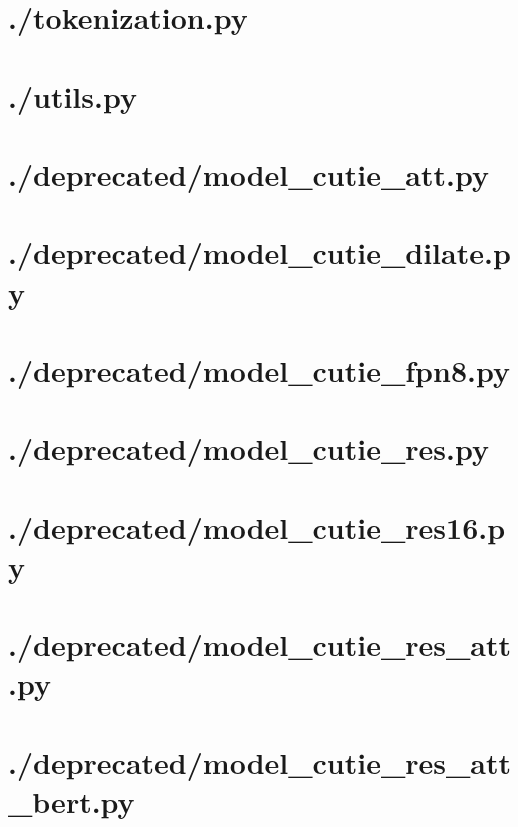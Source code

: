 \documentclass{article}
\begin{document}
    \section{./tokenization.py}
    
    \section{./utils.py}
    
    \section{./deprecated/model\_cutie\_att.py}
    
    \section{./deprecated/model\_cutie\_dilate.py}
    
    \section{./deprecated/model\_cutie\_fpn8.py}
    
    \section{./deprecated/model\_cutie\_res.py}
    
    \section{./deprecated/model\_cutie\_res16.py}
    
    \section{./deprecated/model\_cutie\_res\_att.py}
    
    \section{./deprecated/model\_cutie\_res\_att\_bert.py}
    
\end{document}
